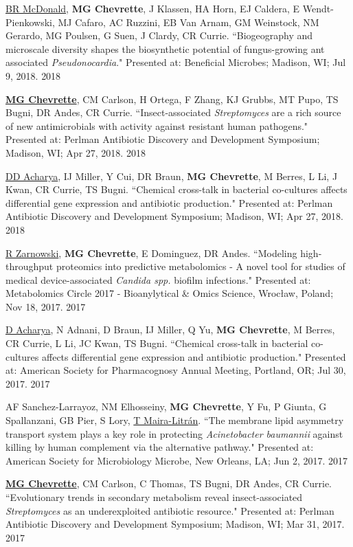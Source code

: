 \begin{cvpubs}
\cvpub
{\underline{BR McDonald}, \textbf{MG Chevrette}, J Klassen, HA Horn, EJ Caldera, E Wendt-Pienkowski, MJ Cafaro, AC Ruzzini, EB Van Arnam, GM Weinstock, NM Gerardo, MG Poulsen, G Suen, J Clardy, CR Currie. ``Biogeography and microscale diversity shapes the biosynthetic potential of fungus-growing ant associated \textit{Pseudonocardia}." Presented at: Beneficial Microbes; Madison, WI; Jul 9, 2018.}
{2018}

\cvpub
{\underline{\textbf{MG Chevrette}}, CM Carlson, H Ortega, F Zhang, KJ Grubbs, MT Pupo, TS Bugni, DR Andes, CR Currie. ``Insect-associated \textit{Streptomyces} are a rich source of new antimicrobials with activity against resistant human pathogens." Presented at: Perlman Antibiotic Discovery and Development Symposium; Madison, WI; Apr 27, 2018.}
{2018}

\cvpub
{\underline{DD Acharya}, IJ Miller, Y Cui, DR Braun, \textbf{MG Chevrette}, M Berres, L Li, J Kwan, CR Currie, TS Bugni. ``Chemical cross-talk in bacterial co-cultures affects differential gene expression and antibiotic production." Presented at: Perlman Antibiotic Discovery and Development Symposium; Madison, WI; Apr 27, 2018.}
{2018}

\cvpub
{\underline{R Zarnowski}, \textbf{MG Chevrette}, E Dominguez, DR Andes. ``Modeling high-throughput proteomics into predictive metabolomics - A novel tool for studies of medical device-associated \textit{Candida spp.} biofilm infections." Presented at: Metabolomics Circle 2017 - Bioanylytical \& Omics Science, Wrocław, Poland; Nov 18, 2017.}
{2017}

\cvpub
{\underline{D Acharya}, N Adnani, D Braun, IJ Miller, Q Yu, \textbf{MG Chevrette}, M Berres, CR Currie, L Li, JC Kwan, TS Bugni. ``Chemical cross-talk in bacterial co-cultures affects differential gene expression and antibiotic production." Presented at: American Society for Pharmacognosy Annual Meeting, Portland, OR; Jul 30, 2017.}
{2017}

\cvpub
{AF Sanchez-Larrayoz, NM Elhosseiny, \textbf{MG Chevrette}, Y Fu, P Giunta, G Spallanzani, GB Pier, S Lory, \underline{T Maira-Litr\'{a}n}. ``The membrane lipid asymmetry transport system plays a key role in protecting \textit{Acinetobacter baumannii} against killing by human complement via the alternative pathway." Presented at: American Society for Microbiology Microbe, New Orleans, LA; Jun 2, 2017.}
{2017}

\cvpub
{\underline{\textbf{MG Chevrette}}, CM Carlson, C Thomas, TS Bugni, DR Andes, CR Currie. ``Evolutionary trends in secondary metabolism reveal insect-associated \textit{Streptomyces} as an underexploited antibiotic resource." Presented at: Perlman Antibiotic Discovery and Development Symposium; Madison, WI; Mar 31, 2017.}
{2017}


\end{cvpubs}
